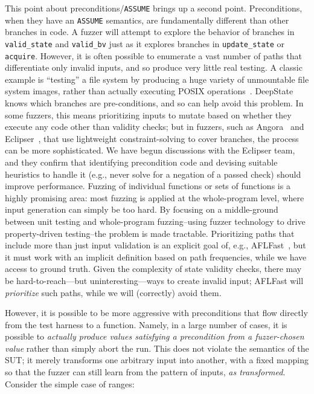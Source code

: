   This point about preconditions/{\tt ASSUME} brings up a second point.  Preconditions, when they have an {\tt ASSUME} semantics, are fundamentally different than other branches in code.  A fuzzer will attempt to explore the behavior of branches in {\tt valid\_state} and {\tt valid\_bv} just as it explores branches in {\tt update\_state} or {\tt acquire}.  However, it is often possible to enumerate a vast number of paths that differentiate only invalid inputs, and so produce very little real testing.  A classic example is ``testing'' a file system by producing a huge variety of unmountable file system images, rather than actually executing POSIX operations~\cite{CFV08,AMAI}.  DeepState knows which branches are pre-conditions, and so can help avoid this problem.  In some fuzzers, this means prioritizing inputs to mutate based on whether they execute any code other than validity checks; but in fuzzers, such as Angora~\cite{angora} and Eclipser~\cite{eclipser}, that use lightweight constraint-solving to cover branches, the process can be more sophisticated.  We have begun discussions with the Eclipser team, and they confirm that identifying precondition code and devising suitable heuristics to handle it (e.g., never solve for a negation of a passed check) should improve performance.  Fuzzing of individual functions or sets of functions is a highly promising area: most fuzzing is applied at the whole-program level, where input generation can simply be too hard.  By focusing on a middle-ground between unit testing and whole-program fuzzing--using fuzzer technology to drive property-driven testing--the problem is made tractable.  Prioritizing paths that include more than just input validation is an explicit goal of, e.g., AFLFast~\cite{aflfast}, but it must work with an implicit definition based on path frequencies, while we have access to ground truth.  Given the complexity of state validity checks, there may be hard-to-reach---but uninteresting---ways to create invalid input; AFLFast will \emph{prioritize} such paths, while we will (correctly) avoid them.

However, it is possible to be more aggressive with preconditions that flow directly from the test harness to a function.  Namely, in a large number of cases, it is possible to \emph{actually produce values satisfying a precondition from a fuzzer-chosen value} rather than simply abort the run.  This does not violate the semantics of the SUT; it merely transforms one arbitrary input into another, with a fixed mapping so that the fuzzer can still learn from the pattern of inputs, \emph{as transformed}.  Consider the simple case of ranges:
  
